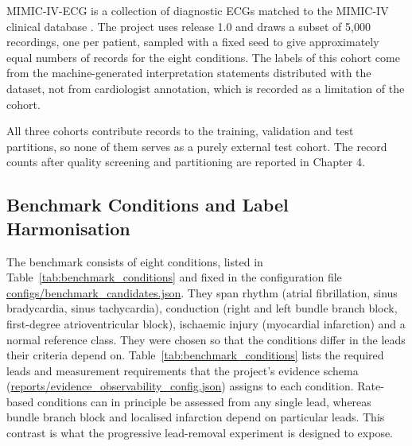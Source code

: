 MIMIC-IV-ECG is a collection of diagnostic ECGs matched to the MIMIC-IV clinical database \cite{GOW2023MIMICIVECG}. The project uses release 1.0 and draws a subset of 5,000 recordings, one per patient, sampled with a fixed seed to give approximately equal numbers of records for the eight conditions. The labels of this cohort come from the machine-generated interpretation statements distributed with the dataset, not from cardiologist annotation, which is recorded as a limitation of the cohort.

All three cohorts contribute records to the training, validation and test partitions, so none of them serves as a purely external test cohort. The record counts after quality screening and partitioning are reported in Chapter 4.

\subsection{Benchmark Conditions and Label Harmonisation}
The benchmark consists of eight conditions, listed in Table~\ref{tab:benchmark_conditions} and fixed in the configuration file \url{configs/benchmark_candidates.json}. They span rhythm (atrial fibrillation, sinus bradycardia, sinus tachycardia), conduction (right and left bundle branch block, first-degree atrioventricular block), ischaemic injury (myocardial infarction) and a normal reference class. They were chosen so that the conditions differ in the leads their criteria depend on. Table~\ref{tab:benchmark_conditions} lists the required leads and measurement requirements that the project's evidence schema (\url{reports/evidence_observability_config.json}) assigns to each condition. Rate-based conditions can in principle be assessed from any single lead, whereas bundle branch block and localised infarction depend on particular leads. This contrast is what the progressive lead-removal experiment is designed to expose.

